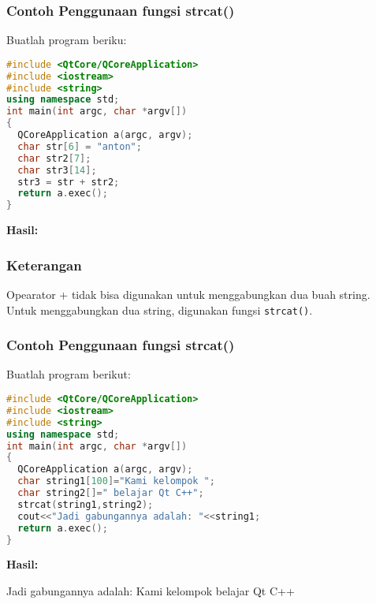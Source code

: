 \subsubsection*{Contoh  Penggunaan fungsi strcat()}

Buatlah program beriku:

\begin{lstlisting}[language=c++, caption=Penggunaan fungsi strcat(), label=contoh3-23]
#include <QtCore/QCoreApplication>
#include <iostream>
#include <string>
using namespace std;
int main(int argc, char *argv[])
{
  QCoreApplication a(argc, argv);
  char str[6] = "anton";
  char str2[7];
  char str3[14];
  str3 = str + str2;
  return a.exec();
}
\end{lstlisting}

\textbf{Hasil:}

\begin{figure}[htbp]
\centering
{}

\end{figure}

\subsubsection*{Keterangan}

Opearator + tidak bisa digunakan untuk menggabungkan dua buah string.
Untuk menggabungkan dua string, digunakan fungsi \texttt{strcat()}.

\subsubsection*{Contoh  Penggunaan fungsi strcat()}

Buatlah program berikut:

\begin{lstlisting}[language=c++, caption=Penggunaan fungsi strcat(), label=contoh3-24]
#include <QtCore/QCoreApplication>
#include <iostream>
#include <string>
using namespace std;
int main(int argc, char *argv[])
{
  QCoreApplication a(argc, argv);
  char string1[100]="Kami kelompok ";
  char string2[]=" belajar Qt C++";
  strcat(string1,string2);
  cout<<"Jadi gabungannya adalah: "<<string1;
  return a.exec();
}
\end{lstlisting}

\textbf{Hasil:}

\begin{lcverbatim}
Jadi gabungannya adalah:
Kami kelompok belajar Qt C++
\end{lcverbatim}


